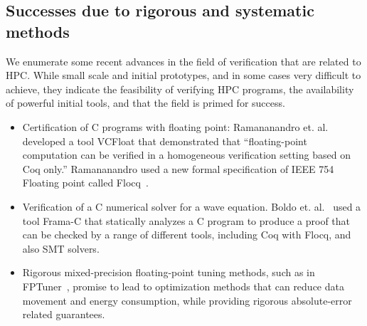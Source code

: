 \subsection{Successes due to rigorous and systematic methods}
\label{sec:sw-fv-promising-methods}

We enumerate some recent advances in the field of verification that are
related to HPC. While small scale and initial prototypes, and in some 
cases very difficult to achieve, they indicate the feasibility of 
verifying HPC programs, the availability of powerful initial tools, 
and that the field is primed for success.

\begin{itemize}
\item Certification of C programs with floating point: 
Ramananandro et. al.~\cite{ramananandro2016unified} developed a 
tool VCFloat that demonstrated that “floating-point computation can 
be verified in a homogeneous verification setting based on Coq only.” 
Ramananandro used a new formal specification of IEEE 754 Floating point 
called Flocq~\cite{boldo2011flocq}.

\item Verification of a C numerical solver for a wave equation. 
Boldo et. al.~\cite{boldo2013wave} used a tool Frama-C that statically 
analyzes a C program to produce a proof that can be checked by 
a range of different tools, including Coq with Flocq, and also SMT solvers.

\item Rigorous mixed-precision floating-point tuning 
methods, such as in FPTuner~\cite{DBLP:conf/popl/ChiangBBSGR17}, 
promise to lead to optimization methods that can reduce data movement 
and energy consumption, while providing rigorous absolute-error related guarantees.



\end{itemize}
